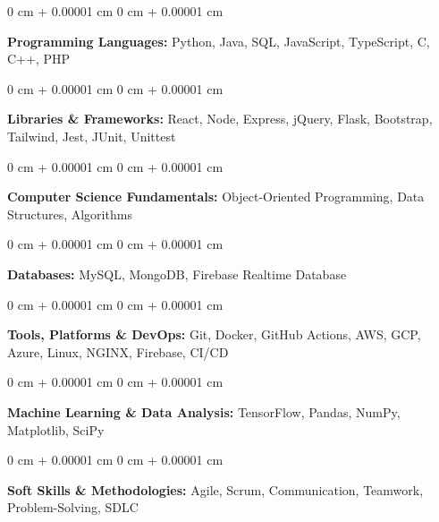 \documentclass[10pt, letterpaper]{article}
\newenvironment{onecolentry}{
    \begin{adjustwidth}{
        0 cm + 0.00001 cm
    }{
        0 cm + 0.00001 cm
    }
}{
    \end{adjustwidth}
} %
\begin{document}
        
        \begin{onecolentry}
            \textbf{Programming Languages:} Python, Java, SQL, JavaScript, TypeScript, C, C++, PHP
        \end{onecolentry}

        \vspace{0.2 cm}

        \begin{onecolentry}
            \textbf{Libraries \& Frameworks:} React, Node, Express, jQuery, Flask, Bootstrap, Tailwind, Jest, JUnit, Unittest
        \end{onecolentry}

        \vspace{0.2 cm}

        \begin{onecolentry}
            \textbf{Computer Science Fundamentals:} Object-Oriented Programming, Data Structures, Algorithms
        \end{onecolentry}

        \vspace{0.2 cm}

        \begin{onecolentry}
            \textbf{Databases:} MySQL, MongoDB, Firebase Realtime Database
        \end{onecolentry}

        \vspace{0.2 cm}

        \begin{onecolentry}
            \textbf{Tools, Platforms \& DevOps:} Git, Docker, GitHub Actions, AWS, GCP, Azure, Linux, NGINX, Firebase, CI/CD
        \end{onecolentry}

        \vspace{0.2 cm}

        \begin{onecolentry}
            \textbf{Machine Learning \& Data Analysis:} TensorFlow, Pandas, NumPy, Matplotlib, SciPy
        \end{onecolentry}

        \vspace{0.2 cm}

        \begin{onecolentry}
            \textbf{Soft Skills \& Methodologies:} Agile, Scrum, Communication, Teamwork, Problem-Solving, SDLC
        \end{onecolentry}
\end{document}
